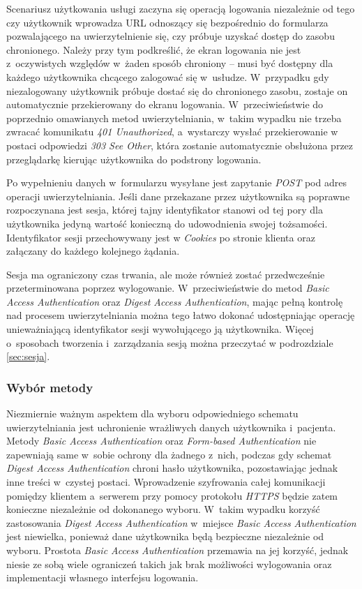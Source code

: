 \documentclass[11pt]{aghdpl}
\begin{document}
Scenariusz użytkowania usługi zaczyna się operacją logowania niezależnie od tego czy użytkownik wprowadza URL odnoszący się bezpośrednio do formularza pozwalającego na uwierzytelnienie się, czy próbuje uzyskać dostęp do zasobu chronionego. Należy przy tym podkreślić, że ekran logowania nie jest z~oczywistych względów w~żaden sposób chroniony -- musi być dostępny dla każdego użytkownika chcącego zalogować się w~usłudze. W~przypadku gdy niezalogowany użytkownik próbuje dostać się do chronionego zasobu, zostaje on automatycznie przekierowany do ekranu logowania. W~przeciwieństwie do poprzednio omawianych metod uwierzytelniania, w~takim wypadku nie trzeba zwracać komunikatu \emph{401 Unauthorized}, a~wystarczy wysłać przekierowanie w postaci odpowiedzi \emph{303 See Other}, która zostanie automatycznie obsłużona przez przeglądarkę kierując użytkownika do podstrony logowania.

Po wypełnieniu danych w~formularzu wysyłane jest zapytanie \emph{POST} pod adres operacji uwierzytelniania. Jeśli dane przekazane przez użytkownika są poprawne rozpoczynana jest sesja, której tajny identyfikator stanowi od tej pory dla użytkownika jedyną wartość konieczną do udowodnienia swojej tożsamości. Identyfikator sesji przechowywany jest w \emph{Cookies} po stronie klienta oraz załączany do każdego kolejnego żądania.

Sesja ma ograniczony czas trwania, ale może również zostać przedwcześnie przeterminowana poprzez wylogowanie. W~przeciwieństwie do metod \emph{Basic Access Authentication} oraz \emph{Digest Access Authentication}, mając pełną kontrolę nad procesem uwierzytelniania można tego łatwo dokonać udostępniając operację unieważniającą identyfikator sesji wywołującego ją użytkownika. Więcej o~sposobach tworzenia i~zarządzania sesją można przeczytać w podrozdziale \ref{sec:sesja}.

\subsubsection{Wybór metody}

Niezmiernie ważnym aspektem dla wyboru odpowiedniego schematu uwierzytelniania jest uchronienie wrażliwych danych użytkownika i~pacjenta. Metody \emph{Basic Access Authentication} oraz \emph{Form-based Authentication} nie zapewniają same w~sobie ochrony dla żadnego z~nich, podczas gdy schemat \emph{Digest Access Authentication} chroni hasło użytkownika, pozostawiając jednak inne treści w~czystej postaci. Wprowadzenie szyfrowania całej komunikacji pomiędzy klientem a~serwerem przy pomocy protokołu \emph{HTTPS} będzie zatem konieczne niezależnie od dokonanego wyboru. W~takim wypadku korzyść zastosowania \emph{Digest Access Authentication} w~miejsce \emph{Basic Access Authentication} jest niewielka, ponieważ dane użytkownika będą bezpieczne niezależnie od wyboru. Prostota \emph{Basic Access Authentication} przemawia na jej korzyść, jednak niesie ze sobą wiele ograniczeń takich jak brak możliwości wylogowania oraz implementacji własnego interfejsu logowania.
\end{document}
